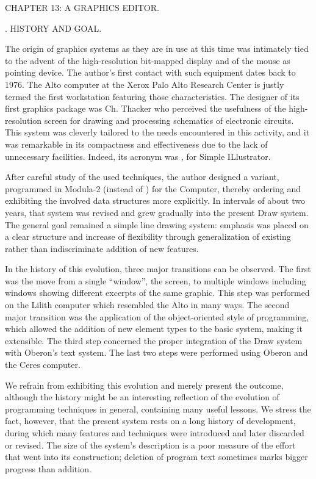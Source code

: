 \beginchapter CHAPTER 13: A GRAPHICS EDITOR.

. HISTORY AND GOAL.

The origin of graphics systems as they are in use at this time was intimately tied to the advent of the high-resolution bit-mapped display and of the mouse as pointing device. The author's first contact with such equipment dates back to 1976. The Alto computer at the Xerox Palo Alto Research Center is justly termed the first workstation featuring those characteristics. The designer of its first graphics package was Ch. Thacker who perceived the usefulness of the high-resolution screen for drawing and processing schematics of electronic circuits. This system was cleverly tailored to the needs encountered in this activity, and it was remarkable in its compactness and effectiveness due to the lack of unnecessary facilities. Indeed, its acronym was , for Simple ILlustrator.

After careful study of the used techniques, the author designed a variant, programmed in Modula-2 (instead of ) for the  Computer, thereby ordering and exhibiting the involved data structures more explicitly. In intervals of about two years, that system was revised and grew gradually into the present Draw system. The general goal remained a simple line drawing system: emphasis was placed on a clear structure and increase of flexibility through generalization of existing rather than indiscriminate addition of new features.

In the history of this evolution, three major transitions can be observed. The first was the move from a single ``window'', the screen, to multiple windows including windows showing different excerpts of the same graphic. This step was performed on the Lilith computer which resembled the Alto in many ways. The second major transition was the application of the object-oriented style of programming, which allowed the addition of new element types to the basic system, making it extensible. The third step concerned the proper integration of the Draw system with Oberon's text system. The last two steps were performed using Oberon and the Ceres computer.

We refrain from exhibiting this evolution and merely present the outcome, although the history might be an interesting reflection of the evolution of programming techniques in general, containing many useful lessons. We stress the fact, however, that the present system rests on a long history of development, during which many features and techniques were introduced and later discarded or revised. The size of the system's description is a poor measure of the effort that went into its construction; deletion of program text sometimes marks bigger progress than addition.

